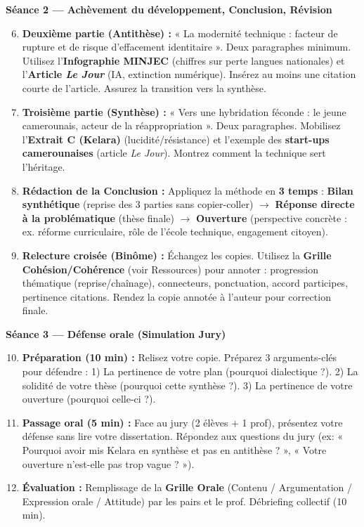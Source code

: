 \documentclass[11pt]{article}
\newcommand{\cle}[1]{{\popxbold\color{popdark}#1}}
\begin{document}
\textbf{Séance 2 — Achèvement du développement, Conclusion, Révision}
\begin{enumerate}
    \setcounter{enumi}{5}
    \item \textbf{Deuxième partie (Antithèse) :} « La modernité technique : facteur de rupture et de risque d'effacement identitaire ». Deux paragraphes minimum. Utilisez l'\textbf{Infographie MINJEC} (chiffres sur perte langues nationales) et l'\textbf{Article \emph{Le Jour}} (IA, extinction numérique). Insérez au moins une citation courte de l'article. Assurez la \cle{transition} vers la synthèse.
    \item \textbf{Troisième partie (Synthèse) :} « Vers une hybridation féconde : le jeune camerounais, acteur de la réappropriation ». Deux paragraphes. Mobilisez l'\textbf{Extrait C (Kelara)} (lucidité/résistance) et l'exemple des \textbf{start-ups camerounaises} (article \emph{Le Jour}). Montrez comment la technique \cle{sert} l'héritage.
    \item \textbf{Rédaction de la Conclusion :} Appliquez la méthode en \textbf{3 temps} : \textbf{Bilan synthétique} (reprise des 3 parties sans copier-coller) $\rightarrow$ \textbf{Réponse directe à la problématique} (thèse finale) $\rightarrow$ \textbf{Ouverture} (perspective concrète : ex. réforme curriculaire, rôle de l'école technique, engagement citoyen).
    \item \textbf{Relecture croisée (Binôme) :} Échangez les copies. Utilisez la \textbf{Grille Cohésion/Cohérence} (voir Ressources) pour annoter : progression thématique (reprise/chaînage), connecteurs, ponctuation, accord participes, pertinence citations. Rendez la copie annotée à l'auteur pour correction finale.
\end{enumerate}

\textbf{Séance 3 — Défense orale (Simulation Jury)}
\begin{enumerate}
    \setcounter{enumi}{9}
    \item \textbf{Préparation (10 min) :} Relisez votre copie. Préparez 3 arguments-clés pour défendre : 1) La pertinence de votre plan (pourquoi dialectique ?). 2) La solidité de votre thèse (pourquoi cette synthèse ?). 3) La pertinence de votre ouverture (pourquoi celle-ci ?).
    \item \textbf{Passage oral (5 min) :} Face au jury (2 élèves + 1 prof), présentez votre défense sans lire votre dissertation. Répondez aux questions du jury (ex: « Pourquoi avoir mis Kelara en synthèse et pas en antithèse ? », « Votre ouverture n'est-elle pas trop vague ? »).
    \item \textbf{Évaluation :} Remplissage de la \textbf{Grille Orale} (Contenu / Argumentation / Expression orale / Attitude) par les pairs et le prof. Débriefing collectif (10 min).
\end{enumerate}
\end{document}
